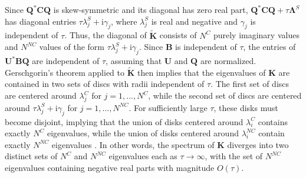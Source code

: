 \documentclass[preprint,10pt]{elsarticle}
\newcommand{\mi}{\mathrm{i}} %
\newcommand{\note}[1]{{\color{blue}#1}}
\begin{document}
Since $\bm{Q}^*\bm{C}\bm{Q}$ is skew-symmetric and its diagonal has zero real part, $\bm{Q}^*\bm{C}\bm{Q} + \tau \bm{\Lambda}^{S}$ has diagonal entries $\tau \lambda^S_j + \mi\gamma_j$, where $\lambda^S_j$ is real and negative and $\gamma_j$ is independent of $\tau$.  Thus, the diagonal of $\tilde{\bm{K}}$ consists of $N^C$ purely imaginary values and $N^{NC}$ values of the form $\tau \lambda^S_j + \mi\gamma_j$.  Since $\bm{B}$ is independent of $\tau$, the entries of $\bm{U}^*\bm{B}\bm{Q}$ are independent of $\tau$, assuming that $\bm{U}$ and $\bm{Q}$ are normalized.  Gerschgorin's theorem applied to $\tilde{\bm{K}}$ then implies that the eigenvalues of $\bm{K}$ are contained in two sets of discs with radii independent of $\tau$.  The first set of discs are centered around $\lambda^C_j$ for $j = 1,\ldots,N^C$, while the second set of discs are centered around $\tau\lambda^S_j + \mi\gamma_j$ for $j = 1,\ldots,N^{NC}$. For sufficiently large $\tau$, these disks must become disjoint, implying that the union of disks centered around  $\lambda^C_i$ contains exactly $N^C$ eigenvalues, while the union of disks centered around  $\lambda^{NC}_i$ contain exactly $N^{NC}$ eigenvalues \cite{horn2012matrix}.  In other words, the \note{spectrum} of $\bm{K}$ diverges into two distinct sets of $N^C$ and $N^{NC}$ eigenvalues each as $\tau \rightarrow \infty$, with the set of $N^{NC}$ eigenvalues containing negative real parts with magnitude $O(\tau)$.  
\end{document}
